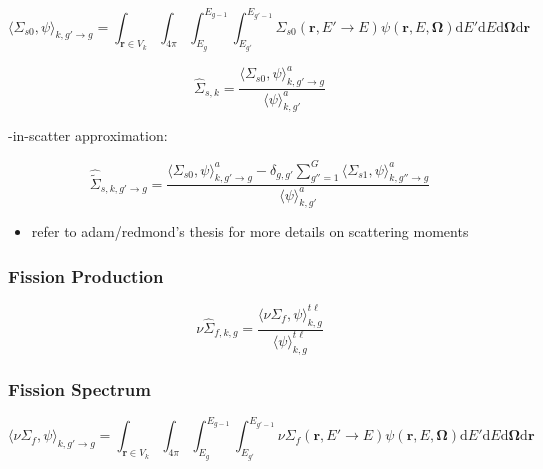 \begin{equation}
\label{eqn:chap3-sigs0}
\langle \Sigma_{s0}, \psi \rangle_{k,g'\rightarrow g} = \int_{\mathbf{r} \in V_{k}} \int_{4\pi} \int_{E_{g}}^{E_{g-1}} \int_{E_{g'}}^{E_{g'-1}} \Sigma_{s0}(\mathbf{r},E'\rightarrow E)\psi(\mathbf{r},E,\mathbf{\Omega}) \mathrm{d}E'\mathrm{d}E\mathrm{d}\mathbf{\Omega}\mathrm{d}\mathbf{r}
\end{equation}

\begin{equation}
\label{eqn:chap3-scatter-macro}
\hat{\Sigma}_{s,k} = \frac{\langle \Sigma_{s0}, \psi \rangle_{k,g'\rightarrow g}^{a}}{\langle \psi \rangle_{k,g'}^{a}}
\end{equation}

-in-scatter approximation:

\begin{equation}
\label{eqn:chap3-scatter-trans-macro}
\hat{\tilde{\Sigma}}_{s,k,g'\rightarrow g} = \frac{\langle \Sigma_{s0}, \psi \rangle_{k,g'\rightarrow g}^{a} - \delta_{g,g'} \displaystyle\sum\limits_{g''=1}^{G} \langle{\Sigma_{s1}, \psi \rangle_{k,g''\rightarrow g}^{a}}}{\langle \psi \rangle_{k,g'}^{a}}
\end{equation}

\begin{itemize}[noitemsep]
  \item refer to adam/redmond's thesis for more details on scattering moments
\end{itemize}

\subsubsection{Fission Production}
\label{subsubsec:chap3-tally-types-fiss-prod}

\begin{equation}
\label{eqn:chap3-nu-fiss-macro}
\nu\hat{\Sigma}_{f,k,g} = \frac{\langle \nu\Sigma_{f}, \psi \rangle_{k,g}^{t\ell}}{\langle \psi \rangle_{k,g}^{t\ell}}
\end{equation}


\subsubsection{Fission Spectrum}
\label{subsubsec:chap3-tally-types-chi}

\begin{equation}
\label{eqn:chap3-nu-fiss-energies}
\langle \nu\Sigma_{f}, \psi \rangle_{k,g'\rightarrow g} = \int_{\mathbf{r} \in V_{k}} \int_{4\pi} \int_{E_{g}}^{E_{g-1}} \int_{E_{g'}}^{E_{g'-1}} \nu\Sigma_{f}(\mathbf{r},E'\rightarrow E)\psi(\mathbf{r},E,\mathbf{\Omega}) \mathrm{d}E'\mathrm{d}E\mathrm{d}\mathbf{\Omega}\mathrm{d}\mathbf{r}
\end{equation}


